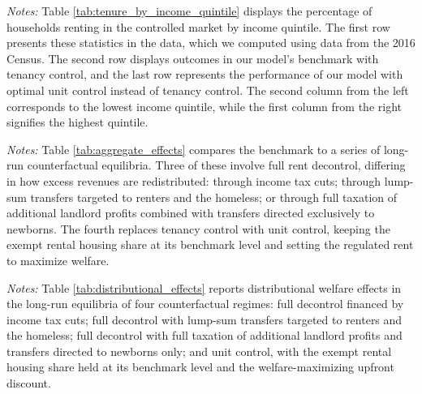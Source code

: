 \documentclass[parskip=full]{article}
\newenvironment{fignote2}[1]
{
\par
\medskip
\begin{minipage}{#1}
\footnotesize
}
{
\end{minipage}
}
\begin{document}
\begin{table}[H]
    \centering
    \caption{Households in controlled market by income quintile (all households)}
    \label{tab:tenure_by_income_quintile}     
    \begin{fignote2}{0.81\textwidth}
    \textit{Notes:} Table \ref{tab:tenure_by_income_quintile} displays the percentage of households renting in the controlled market by income quintile. The first row presents these statistics in the data, which we computed using data from the 2016 Census. The second row displays outcomes in our model's benchmark with tenancy control, and the last row represents the performance of our model with optimal unit control instead of tenancy control. The second column from the left corresponds to the lowest income quintile, while the first column from the right signifies the highest quintile. 
    \end{fignote2}
\end{table}

\begin{table}[H]
    \centering
    \caption{Aggregate effects generated by changes in rent-control policy}
    \label{tab:aggregate_effects}
    
    \begin{fignote2}{1.00\textwidth}
    \textit{Notes:} Table \ref{tab:aggregate_effects} compares the benchmark to a series of long-run counterfactual equilibria. Three of these involve full rent decontrol, differing in how excess revenues are redistributed: through income tax cuts; through lump-sum transfers targeted to renters and the homeless; or through full taxation of additional landlord profits combined with transfers directed exclusively to newborns. The fourth replaces tenancy control with unit control, keeping the exempt rental housing share at its benchmark level and setting the regulated rent to maximize welfare.
    \end{fignote2}
\end{table}

\begin{table}[H]
    \centering
    \caption{Distributional welfare effects for newborns followed by changes in rent-control policy}
    \label{tab:distributional_effects}
    
    \begin{fignote2}{0.73\textwidth}
    \textit{Notes:} Table \ref{tab:distributional_effects} reports distributional welfare effects in the long-run equilibria of four counterfactual regimes: full decontrol financed by income tax cuts; full decontrol with lump-sum transfers targeted to renters and the homeless; full decontrol with full taxation of additional landlord profits and transfers directed to newborns only; and unit control, with the exempt rental housing share held at its benchmark level and the welfare-maximizing upfront discount.
    \end{fignote2}
\end{table}
\end{document}
